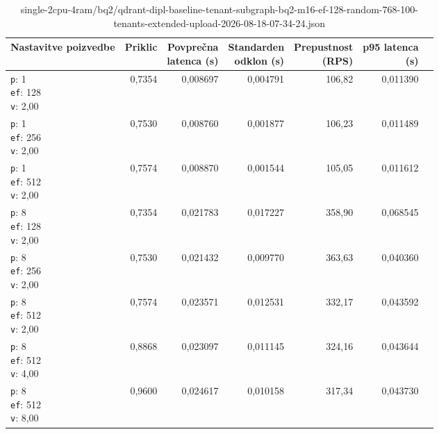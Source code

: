 \begin{table}[htbp]
  \centering
\small
  \caption{single-2cpu-4ram/bq2/qdrant-dipl-baseline-tenant-subgraph-bq2-m16-ef-128-random-768-100-tenants-extended-upload-2026-08-18-07-34-24.json}
  \label{tab:single-2cpu-4ram:bq2:qdrant-dipl-baseline-tenant-subgraph-bq2-m16-ef-128-random-768-100-tenants-extended-upload-2026-08-18-07-34-24.json}
  \begin{tabularx}{\textwidth}{Xrrrrrr}
    \toprule
    Nastavitve poizvedbe & Priklic & \makecell{Povprečna\\latenca (s)} & \makecell{Standarden\\odklon (s)} & \makecell{Prepustnost\\(RPS)} & \makecell{p95 latenca\\(s)}  \\
    \midrule
    \makecell{\texttt{p}: 1\\\texttt{ef}: 128\\\texttt{v}: 2,00} & 0,7354 & 0,008697 & 0,004791 & 106,82 & 0,011390 \\
    \makecell{\texttt{p}: 1\\\texttt{ef}: 256\\\texttt{v}: 2,00} & 0,7530 & 0,008760 & 0,001877 & 106,23 & 0,011489 \\
    \makecell{\texttt{p}: 1\\\texttt{ef}: 512\\\texttt{v}: 2,00} & 0,7574 & 0,008870 & 0,001544 & 105,05 & 0,011612 \\
    \makecell{\texttt{p}: 8\\\texttt{ef}: 128\\\texttt{v}: 2,00} & 0,7354 & 0,021783 & 0,017227 & 358,90 & 0,068545 \\
    \makecell{\texttt{p}: 8\\\texttt{ef}: 256\\\texttt{v}: 2,00} & 0,7530 & 0,021432 & 0,009770 & 363,63 & 0,040360 \\
    \makecell{\texttt{p}: 8\\\texttt{ef}: 512\\\texttt{v}: 2,00} & 0,7574 & 0,023571 & 0,012531 & 332,17 & 0,043592 \\
    \makecell{\texttt{p}: 8\\\texttt{ef}: 512\\\texttt{v}: 4,00} & 0,8868 & 0,023097 & 0,011145 & 324,16 & 0,043644 \\
    \makecell{\texttt{p}: 8\\\texttt{ef}: 512\\\texttt{v}: 8,00} & 0,9600 & 0,024617 & 0,010158 & 317,34 & 0,043730 \\

\end{tabularx}
\end{table}
